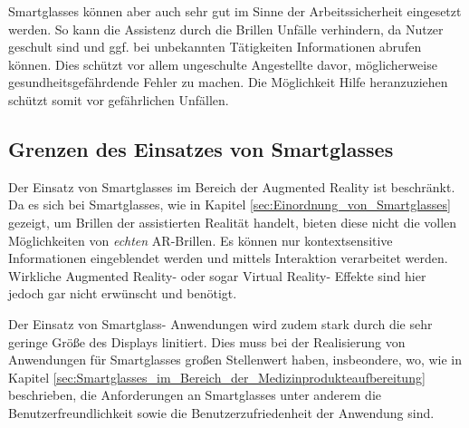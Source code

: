 Smartglasses können aber auch sehr gut im Sinne der Arbeitssicherheit eingesetzt werden. So kann die Assistenz durch die Brillen Unfälle verhindern, da Nutzer geschult sind und ggf. bei unbekannten Tätigkeiten Informationen abrufen können. Dies schützt vor allem ungeschulte Angestellte davor, möglicherweise gesundheitsgefährdende Fehler zu machen. Die Möglichkeit Hilfe heranzuziehen schützt somit vor gefährlichen Unfällen.
%
%
\subsection{Grenzen des Einsatzes von Smartglasses}
\label{sec:Grenzen_des_Einsatzes_von_Smartglasses}
Der Einsatz von Smartglasses im Bereich der Augmented Reality ist beschränkt. Da es sich bei Smartglasses, wie in Kapitel \ref{sec:Einordnung_von_Smartglasses} gezeigt, um Brillen der assistierten Realität handelt, bieten diese nicht die vollen Möglichkeiten von \emph{echten} AR-Brillen. Es können nur kontextsensitive Informationen eingeblendet werden und mittels Interaktion verarbeitet werden. Wirkliche Augmented Reality- oder sogar Virtual Reality- Effekte sind hier jedoch gar nicht erwünscht und benötigt.

Der Einsatz von Smartglass- Anwendungen wird zudem stark durch die sehr geringe Größe des Displays linitiert. Dies muss bei der Realisierung von Anwendungen für Smartglasses großen Stellenwert haben, insbeondere, wo, wie in Kapitel \ref{sec:Smartglasses_im_Bereich_der_Medizinprodukteaufbereitung} beschrieben, die Anforderungen an Smartglasses unter anderem die Benutzerfreundlichkeit sowie die Benutzerzufriedenheit der Anwendung sind.

